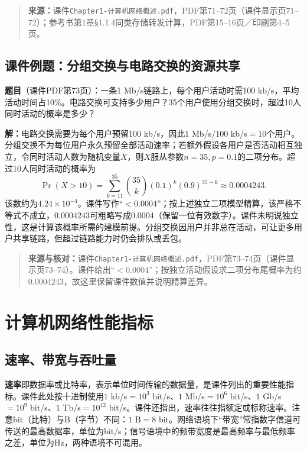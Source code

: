 \begin{quote}\small\textbf{来源：}课件\texttt{Chapter1-计算机网络概述.pdf}，PDF第71--72页（课件显示页71--72）；参考书第1章§1.1.4同类存储转发计算，PDF第15--16页／印刷第4--5页。\end{quote}
\annotationarea[4]

\subsection{课件例题：分组交换与电路交换的资源共享}

\textbf{题目}（课件PDF第73页）：一条1 Mb/s链路上，每个用户活动时需100 kb/s，平均活动时间占10\%。电路交换可支持多少用户？35个用户使用分组交换时，超过10人同时活动的概率是多少？

\textbf{解：}电路交换需要为每个用户预留100 kb/s，因此$1$ Mb/s$/100$ kb/s$=10$个用户。分组交换不为每位用户永久预留全部活动速率；若额外假设各用户是否活动相互独立，令同时活动人数为随机变量$X$，则$X$服从参数$n=35,p=0.1$的二项分布。超过10人同时活动的概率为
\[
\Pr(X>10)=\sum_{k=11}^{35}{35\choose k}(0.1)^k(0.9)^{35-k}
\approx 0.0004243.
\]
该数约为$4.24\times10^{-4}$。课件写作“$<0.0004$”；按上述独立二项模型精算，该严格不等式不成立，$0.0004243$可粗略写成$0.0004$（保留一位有效数字）。课件未明说独立性，这是计算该概率所需的建模前提。分组交换因用户并非总在活动，可让更多用户共享链路，但超过链路能力时仍会排队或丢包。
\annotationarea[4]

\begin{quote}\small\textbf{来源与核对：}课件\texttt{Chapter1-计算机网络概述.pdf}，PDF第73--74页（课件显示页73--74）。课件给出“$<0.0004$”；按独立活动假设求二项分布尾概率为约$0.0004243$，故这里保留课件数值并说明精算差异。\end{quote}
\annotationarea[4]

\section{计算机网络性能指标}

\subsection{速率、带宽与吞吐量}

\textbf{速率}即数据率或比特率，表示单位时间传输的数据量，是课件列出的重要性能指标。课件此处按十进制使用$1$ kb/s$=10^3$ bit/s、$1$ Mb/s$=10^6$ bit/s、$1$ Gb/s$=10^9$ bit/s、$1$ Tb/s$=10^{12}$ bit/s。课件还指出，速率往往指额定或标称速率。注意bit（比特）与B（字节）不同：$1$ B$=8$ bit。网络语境下“带宽”常指数字信道可传送的最高数据率，单位为bit/s；信号语境中的频带宽度是最高频率与最低频率之差，单位为Hz，两种语境不可混用。

